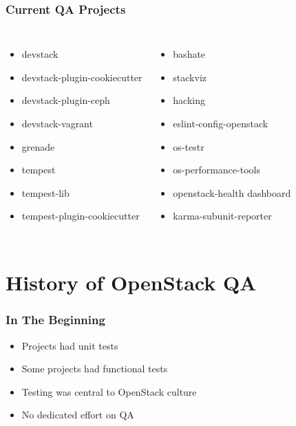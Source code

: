 \documentclass[aspectratio=169,11pt,hyperref={colorlinks=true}]{beamer}
\begin{document}
\begin{frame}
    \frametitle{Current QA Projects}
    \begin{columns}
            \begin{itemize}
                \item{devstack}
                \item{devstack-plugin-cookiecutter}
                \item{devstack-plugin-ceph}
                \item{devstack-vagrant}
                \item{grenade}
                \item{tempest}
                \item{tempest-lib}
                \item{tempest-plugin-cookiecutter}
            \end{itemize}
            \begin{itemize}
                \item{bashate}
                \item{stackviz}
                \item{hacking}
                \item{eslint-config-openstack}
                \item{os-testr}
                \item{os-performance-tools}
                \item{openstack-health dashboard}
                \item{karma-subunit-reporter}
            \end{itemize}
    \end{columns}
\end{frame}

\section{History of OpenStack QA}

\begin{frame}
    \frametitle{In The Beginning}
    \begin{itemize}
    \item Projects had unit tests
    \item Some projects had functional tests
    \item Testing was central to OpenStack culture
    \item No dedicated effort on QA
    \end{itemize}
\end{frame}
\end{document}

